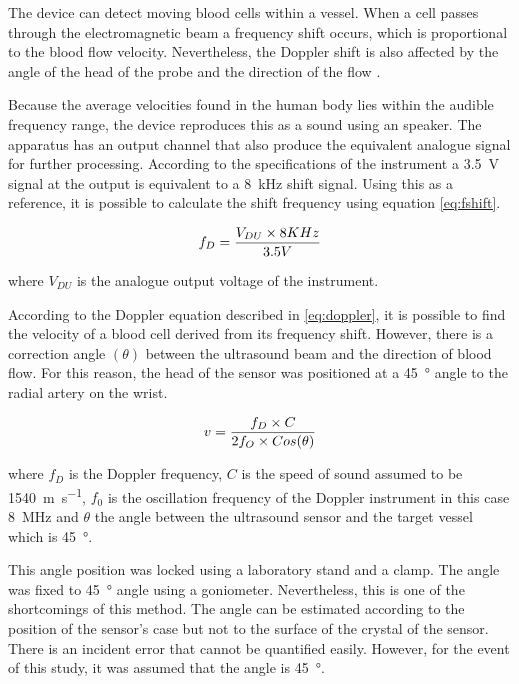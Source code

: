 The device can detect moving blood cells within a vessel. When a cell passes through the electromagnetic beam a frequency shift occurs, which is proportional to the blood flow velocity. Nevertheless, the Doppler shift is also affected by the angle of the head of the probe and the direction of the flow \cite{surgeonhand2002Hand}.

Because the average velocities found in the human body lies within the audible frequency range, the device reproduces this as a sound using an speaker. The apparatus has an output channel that also produce the equivalent analogue signal for further processing. According to the specifications of the instrument a \SI{3.5}{\volt} signal at the output is equivalent to a \SI{8}{\kilo\hertz} shift signal. Using this as a reference, it is possible to calculate the shift frequency using equation \ref{eq:fshift}.

\begin{align}
	\label{eq:fshift}
	f_D = \frac{V_{DU} \times 8 KHz}{3.5V} \tagaddtext{[\si{\hertz}]}
\end{align}  

where $V_{DU}$ is the analogue output voltage of the instrument. 

According to the Doppler equation described in \ref{eq:doppler}, it is possible to find the velocity of a blood cell derived from its frequency shift. However, there is a correction angle $(\theta)$ between the ultrasound beam and the direction of blood flow. For this reason, the head of the sensor was positioned at a \SI{45}{\degree} angle to the radial artery on the wrist.

\begin{align}
	\label{eq:doppler}
	v = \frac{f_D \times C}{2 f_O \times Cos(\theta)} \tagaddtext{[\si{\meter\per\second}]}
\end{align}

where $f_D$ is the Doppler frequency, $C$ is the speed of sound assumed to be \SI{1540}{\meter\per\second}, $f_0$ is the oscillation frequency of the Doppler instrument in this case \SI{8}{\mega\hertz} and $\theta$ the angle between the ultrasound sensor and the target vessel which is \SI{45}{\degree}.

This angle position was locked using a laboratory stand and a clamp. The angle was fixed to \SI{45}{\degree} angle using a goniometer. Nevertheless, this is one of the shortcomings of this method. The angle can be estimated according to the position of the sensor's case but not to the surface of the crystal of the sensor. There is an incident error that cannot be quantified easily. However, for the event of this study, it was assumed that the angle is \SI{45}{\degree}.

